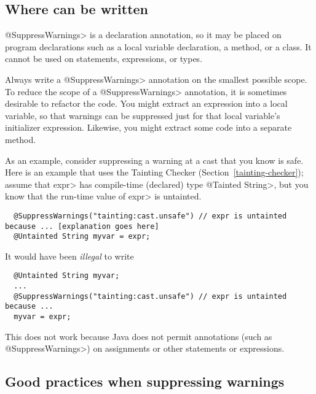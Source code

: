 \subsection{Where  can be written\label{suppresswarnings-annotation-locations}}

\<@SuppressWarnings> is a declaration annotation, so it may be placed on
program declarations such as a local variable declaration, a method, or a
class.  It cannot be used on statements, expressions, or types.

Always write a \<@SuppressWarnings> annotation on the smallest possible
scope.  To reduce the scope of a \<@SuppressWarnings> annotation, it is
sometimes desirable to refactor the code.  You might extract an expression
into a local variable, so that warnings can be suppressed just for that
local variable's initializer expression.  Likewise, you might extract some
code into a separate method.

As an example, consider suppressing a warning at a cast that you know is
safe.  Here is an example that uses the Tainting Checker
(Section~\ref{tainting-checker}); assume that \<expr> has compile-time
(declared) type \<@Tainted String>, but you know that the run-time value of
\<expr> is untainted.

\begin{smaller}
\begin{Verbatim}
  @SuppressWarnings("tainting:cast.unsafe") // expr is untainted because ... [explanation goes here]
  @Untainted String myvar = expr;
\end{Verbatim}
\end{smaller}

\noindent
It would have been \emph{illegal} to write

\begin{smaller}
\begin{Verbatim}
  @Untainted String myvar;
  ...
  @SuppressWarnings("tainting:cast.unsafe") // expr is untainted because ...
  myvar = expr;
\end{Verbatim}
\end{smaller}

\noindent
This does not work because
Java does not permit annotations (such as \<@SuppressWarnings>) on
assignments or other statements or expressions.


\subsection{Good practices when suppressing warnings\label{suppresswarnings-best-practices}}

